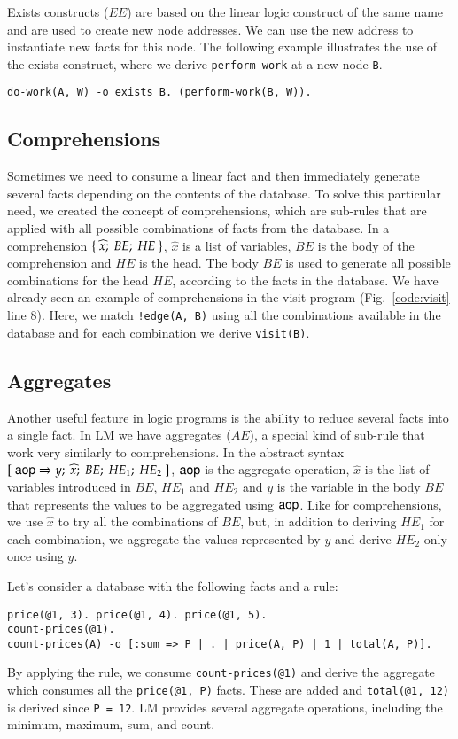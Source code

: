Exists constructs ($EE$) are based on the linear logic construct of the same name and are used to create new node addresses.
We can use the new address to instantiate new facts for this node.  
The following example illustrates the use of the exists construct, where we derive
\texttt{perform-work} at a new node \texttt{B}.

\begin{Verbatim}
do-work(A, W) -o exists B. (perform-work(B, W)).
\end{Verbatim}

\subsection{Comprehensions}

Sometimes we need to consume a linear fact and then immediately generate several facts depending on
the contents of the database. To solve this particular need, we created the concept of comprehensions, which are
sub-rules that are applied with all possible combinations of facts from the database. In a comprehension $\{ \; \widehat{x}; \; BE; \; HE \; \}$, $\widehat{x}$ is a list of variables, $BE$ is the body of the comprehension and $HE$ is the head.
The body $BE$ is used to generate all possible combinations for the head $HE$, according to the facts
in the database.  We have already seen an example of comprehensions in the visit program (Fig.~\ref{code:visit} line 8).
Here, we match \texttt{!edge(A, B)} using all the combinations available in the database and for each combination we derive \texttt{visit(B)}.

\subsection{Aggregates}

Another useful feature in logic programs is the ability to reduce several facts into a single fact.
In LM we have aggregates ($AE$), a special kind of sub-rule that work very similarly to comprehensions.
In the abstract syntax $[\;\mathsf{aop} \Rightarrow y; \; \widehat{x}; \; BE; \; HE_1; \; HE_2 \;]$, $\mathsf{aop}$ is the aggregate operation, $\widehat{x}$ is the list of variables
introduced in $BE$, $HE_1$ and $HE_2$ and $y$ is the variable in the body
$BE$ that represents the values to be aggregated using $\mathsf{aop}$. Like for comprehensions,
we use $\widehat{x}$ to try all the combinations of $BE$, but, in addition to deriving $HE_1$ for each combination,
we aggregate the values represented by $y$ and derive $HE_2$ only once using $y$.

Let's consider a database with the following facts and a rule:

\begin{Verbatim}
price(@1, 3). price(@1, 4). price(@1, 5).
count-prices(@1).
count-prices(A) -o [:sum => P | . | price(A, P) | 1 | total(A, P)].
\end{Verbatim}

By applying the rule, we consume \texttt{count-prices(@1)} and
derive the aggregate which consumes all the \texttt{price(@1, P)} facts.
These are added and \texttt{total(@1,~12)} is derived since \texttt{P~=~12}.
LM provides several aggregate operations, including the minimum, maximum, sum, and count.

